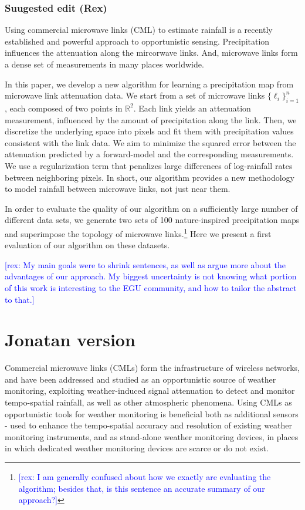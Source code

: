 \documentclass{article}
\newcommand{\rex}[1]{\textcolor{blue}{[rex: #1]}}
\begin{document}
\subsubsection{Suugested edit (Rex)}


Using commercial microwave links (CML) to estimate rainfall is a recently established and powerful approach to opportunistic sensing. Precipitation influences the attenuation along the mircorwave links. And, microwave links form a dense set of measurements in many places worldwide. 

In this paper, we develop a new algorithm for learning a precipitation map 
from microwave link attenuation data. We start from a set of microwave links
$\{\ell_i\}_{i=1}^n$, each composed of two points in $\mathbb{R}^2$. Each link yields an attenuation measurement, influenced by the amount of precipitation along the link.
Then, we discretize the underlying space into pixels and fit them with precipitation values consistent with the link data.
We aim to minimize the squared error between the attenuation predicted by a forward-model and the corresponding measurements. We use a regularization term that penalizes large  differences of log-rainfall rates between neighboring pixels.
In short, our algorithm provides a new methodology to model rainfall between microwave links, not just near them. 


In order to evaluate the quality of our algorithm on a sufficiently large number of different data sets, we generate two sets of 100 nature-inspired precipitation maps and superimpose the topology of microwave links.\footnote{\rex{I am generally confused about how we exactly are evaluating the algorithm; besides that, is this sentence an accurate summary of our approach?}} Here we present a first evaluation of our algorithm on these datasets.


\rex{My main goals were to shrink sentences, as well as argue more about the advantages of our approach. My biggest uncertainty is not knowing what portion of this work is interesting to the EGU community, and how to tailor the abstract to that.}


\section{Jonatan version}

Commercial microwave links (CMLs) form the infrastructure of wireless networks, and have been addressed and studied as an opportunistic source of weather monitoring, exploiting weather-induced signal attenuation to detect and monitor tempo-spatial rainfall, as well as other atmospheric phenomena. Using CMLs as opportunistic tools for weather monitoring is beneficial both as additional sensors - used to enhance the tempo-spatial accuracy and resolution of existing weather monitoring instruments, and as stand-alone weather monitoring devices, in places in which dedicated weather monitoring devices are scarce or do not exist.
\end{document}

